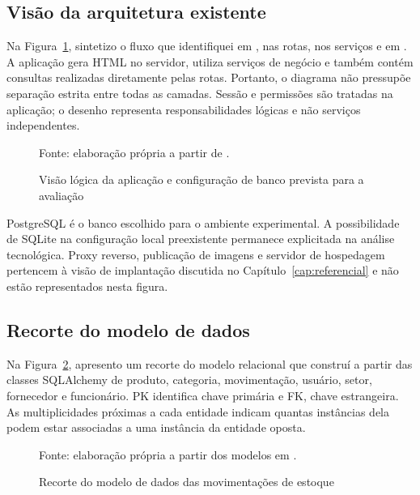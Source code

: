 \subsection{Visão da arquitetura existente}

Na Figura~\ref{fig:arquitetura-estoque}, sintetizo o fluxo que identifiquei em , nas rotas, nos serviços e em . A aplicação gera HTML no servidor, utiliza serviços de negócio e também contém consultas realizadas diretamente pelas rotas. Portanto, o diagrama não pressupõe separação estrita entre todas as camadas. Sessão e permissões são tratadas na aplicação; o desenho representa responsabilidades lógicas e não serviços independentes.

\begin{figure}[htb]
\centering

\caption{Visão lógica da aplicação e configuração de banco prevista para a avaliação}
\label{fig:arquitetura-estoque}
\par\smallskip
{\footnotesize Fonte: elaboração própria a partir de \cite{EstoqueFacilRepositorio}.}
\end{figure}

PostgreSQL é o banco escolhido para o ambiente experimental. A possibilidade de SQLite na configuração local preexistente permanece explicitada na análise tecnológica. Proxy reverso, publicação de imagens e servidor de hospedagem pertencem à visão de implantação discutida no Capítulo~\ref{cap:referencial} e não estão representados nesta figura.

\subsection{Recorte do modelo de dados}

Na Figura~\ref{fig:dados-estoque}, apresento um recorte do modelo relacional que construí a partir das classes SQLAlchemy de produto, categoria, movimentação, usuário, setor, fornecedor e funcionário. PK identifica chave primária e FK, chave estrangeira. As multiplicidades próximas a cada entidade indicam quantas instâncias dela podem estar associadas a uma instância da entidade oposta.

\begin{figure}[htb]
\centering

\caption{Recorte do modelo de dados das movimentações de estoque}
\label{fig:dados-estoque}
\par\smallskip
{\footnotesize Fonte: elaboração própria a partir dos modelos em \cite{EstoqueFacilRepositorio}.}
\end{figure}

